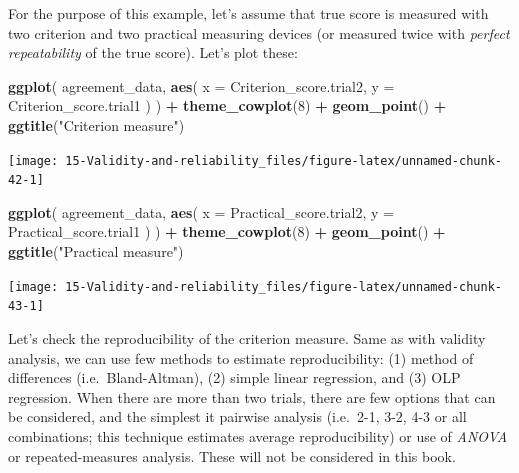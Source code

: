 \documentclass[
]{book}
\newenvironment{Shaded}{\begin{snugshade}}{\end{snugshade}}
\newcommand{\DataTypeTok}[1]{\textcolor[rgb]{0.13,0.29,0.53}{#1}}
\newcommand{\DecValTok}[1]{\textcolor[rgb]{0.00,0.00,0.81}{#1}}
\newcommand{\KeywordTok}[1]{\textcolor[rgb]{0.13,0.29,0.53}{\textbf{#1}}}
\newcommand{\NormalTok}[1]{#1}
\newcommand{\OperatorTok}[1]{\textcolor[rgb]{0.81,0.36,0.00}{\textbf{#1}}}
\newcommand{\StringTok}[1]{\textcolor[rgb]{0.31,0.60,0.02}{#1}}
\begin{document}
For the purpose of this example, let's assume that true score is measured with two criterion and two practical measuring devices (or measured twice with \emph{perfect repeatability} of the true score). Let's plot these:

\begin{Shaded}
\begin{Highlighting}[]
\KeywordTok{ggplot}\NormalTok{(}
\NormalTok{  agreement\_data,}
  \KeywordTok{aes}\NormalTok{(}
    \DataTypeTok{x =}\NormalTok{ Criterion\_score.trial2,}
    \DataTypeTok{y =}\NormalTok{ Criterion\_score.trial1}
\NormalTok{  )}
\NormalTok{) }\OperatorTok{+}
\StringTok{  }\KeywordTok{theme\_cowplot}\NormalTok{(}\DecValTok{8}\NormalTok{) }\OperatorTok{+}
\StringTok{  }\KeywordTok{geom\_point}\NormalTok{() }\OperatorTok{+}
\StringTok{  }\KeywordTok{ggtitle}\NormalTok{(}\StringTok{"Criterion measure"}\NormalTok{)}
\end{Highlighting}
\end{Shaded}

\begin{center}\texttt{[image: 15-Validity-and-reliability\_files/figure-latex/unnamed-chunk-42-1]} \end{center}

\begin{Shaded}
\begin{Highlighting}[]
\KeywordTok{ggplot}\NormalTok{(}
\NormalTok{  agreement\_data,}
  \KeywordTok{aes}\NormalTok{(}
    \DataTypeTok{x =}\NormalTok{ Practical\_score.trial2,}
    \DataTypeTok{y =}\NormalTok{ Practical\_score.trial1}
\NormalTok{  )}
\NormalTok{) }\OperatorTok{+}
\StringTok{  }\KeywordTok{theme\_cowplot}\NormalTok{(}\DecValTok{8}\NormalTok{) }\OperatorTok{+}
\StringTok{  }\KeywordTok{geom\_point}\NormalTok{() }\OperatorTok{+}
\StringTok{  }\KeywordTok{ggtitle}\NormalTok{(}\StringTok{"Practical measure"}\NormalTok{)}
\end{Highlighting}
\end{Shaded}

\begin{center}\texttt{[image: 15-Validity-and-reliability\_files/figure-latex/unnamed-chunk-43-1]} \end{center}

Let's check the reproducibility of the criterion measure. Same as with validity analysis, we can use few methods to estimate reproducibility: (1) method of differences (i.e.~Bland-Altman), (2) simple linear regression, and (3) OLP regression. When there are more than two trials, there are few options that can be considered, and the simplest it pairwise analysis (i.e.~2-1, 3-2, 4-3 or all combinations; this technique estimates average reproducibility) or use of \emph{ANOVA} or repeated-measures analysis. These will not be considered in this book.
\end{document}
